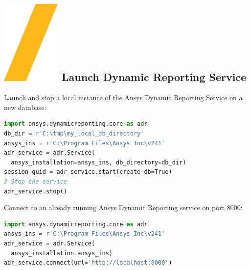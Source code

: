 \documentclass[9pt,landscape]{article}
\begin{document}
\begin{multicols}{3}
\setlength{\premulticols}{1pt}
\setlength{\postmulticols}{1pt}
\setlength{\multicolsep}{1pt}
\setlength{\columnsep}{2pt}

\section{\includegraphics[height=\fontcharht\font`\S]{slash.png} Launch Dynamic Reporting Service}
Launch and stop a local instance of the Ansys Dynamic Reporting Service on a new database:
\begin{lstlisting}[language=Python]
import ansys.dynamicreporting.core as adr
db_dir = r'C:\tmp\my_local_db_directory'
ansys_ins = r'C:\Program Files\Ansys Inc\v241'
adr_service = adr.Service(
  ansys_installation=ansys_ins, db_directory=db_dir)
session_guid = adr_service.start(create_db=True)
# Stop the service
adr_service.stop()
\end{lstlisting}

Connect to an already running Ansys Dynamic Reporting service on port 8000:

\begin{lstlisting}[language=Python]
import ansys.dynamicreporting.core as adr
ansys_ins = r'C:\Program Files\Ansys Inc\v241'
adr_service = adr.Service(
  ansys_installation=ansys_ins)
adr_service.connect(url='http://localhost:8000') 
\end{lstlisting}


\end{multicols}
\end{document}
